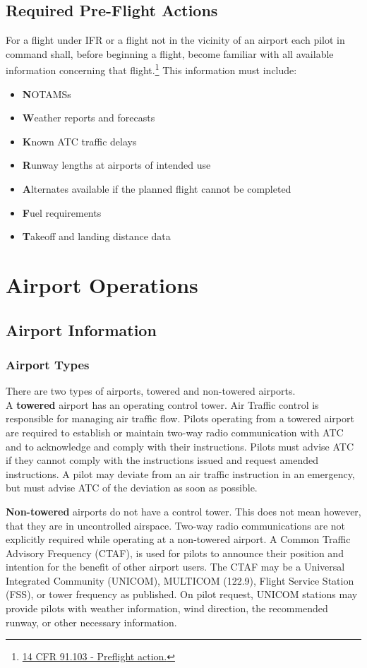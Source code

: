 \documentclass[12pt]{article}
\begin{document}
	\subsection{Required Pre-Flight Actions}
		For a flight under IFR or a flight not in the vicinity of an airport each pilot in command shall, before beginning a flight, become familiar with all available information concerning that flight.\footnote{\href{https://www.law.cornell.edu/cfr/text/14/91.103}{14 CFR 91.103 - Preflight action.}} This information must include:
		\begin{itemize}
			\item \textbf{N}OTAMSs
			\item \textbf{W}eather reports and forecasts
			\item \textbf{K}nown ATC traffic delays
			\item \textbf{R}unway lengths at airports of intended use
			\item \textbf{A}lternates available if the planned flight cannot be completed
			\item \textbf{F}uel requirements
			\item \textbf{T}akeoff and landing distance data
		\end{itemize}
\newpage
\section{Airport Operations}
	\subsection{Airport Information}
		\subsubsection{Airport Types}
			There are two types of airports, towered and non-towered airports.\\

			A \textbf{towered} airport has an operating control tower. Air Traffic control is responsible for managing air traffic flow. Pilots operating from a towered airport are required to establish or maintain two-way radio communication with ATC and to acknowledge and comply with their instructions. Pilots must advise ATC if they cannot comply with the instructions issued and request amended instructions. A pilot may deviate from an air traffic instruction in an emergency, but must advise ATC of the deviation as soon as possible.

			\textbf{Non-towered} airports do not have a control tower. This does not mean however, that they are in uncontrolled airspace. Two-way radio communications are not explicitly required while operating at a non-towered airport. A Common Traffic Advisory Frequency (CTAF), is used for pilots to announce their position and intention for the benefit of other airport users. The CTAF may be a Universal Integrated Community (UNICOM), MULTICOM (122.9), Flight Service Station (FSS), or tower frequency as published. On pilot request, UNICOM stations may provide pilots with weather information, wind direction, the recommended runway, or other necessary information.
\end{document}

